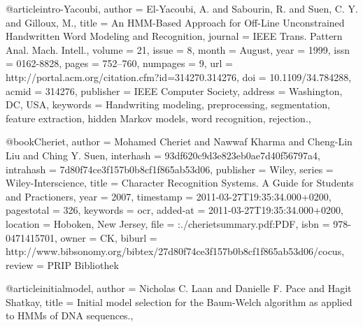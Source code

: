 @article{intro-Yacoubi,
 author = {El-Yacoubi, A. and Sabourin, R. and Suen, C. Y. and Gilloux, M.},
 title = {An HMM-Based Approach for Off-Line  Unconstrained Handwritten Word Modeling and Recognition},
 journal = {IEEE Trans. Pattern Anal. Mach. Intell.},
 volume = {21},
 issue = {8},
 month = {August},
 year = {1999},
 issn = {0162-8828},
 pages = {752--760},
 numpages = {9},
 url = {http://portal.acm.org/citation.cfm?id=314270.314276},
 doi = {10.1109/34.784288},
 acmid = {314276},
 publisher = {IEEE Computer Society},
 address = {Washington, DC, USA},
 keywords = {Handwriting modeling, preprocessing, segmentation, feature extraction, hidden Markov models, word recognition, rejection.},
} 

@book{Cheriet,
  author = {Mohamed Cheriet and Nawwaf Kharma and Cheng-Lin Liu and Ching Y. Suen},
  interhash = {93df620c9d3e823eb0ae7d40f56797a4},
  intrahash = {7d80f74ce3f157b0b8cf1f865ab53d06},
  publisher = {Wiley},
  series = {Wiley-Interscience},
  title = {Character Recognition Systems. A Guide for Students and Practioners},
  year = 2007,
  timestamp = {2011-03-27T19:35:34.000+0200},
  pagestotal = {326},
  keywords = {ocr},
  added-at = {2011-03-27T19:35:34.000+0200},
  location = {Hoboken, New Jersey},
  file = {:./cherietsummary.pdf:PDF},
  isbn = {978-0471415701},
  owner = {CK},
  biburl = {http://www.bibsonomy.org/bibtex/27d80f74ce3f157b0b8cf1f865ab53d06/cocus},
  review = {PRIP Bibliothek}
}

@article{initialmodel,
  author    = {Nicholas C. Laan and Danielle F. Pace and Hagit Shatkay},
  title     = {Initial model selection for the Baum-Welch algorithm as applied to HMMs of DNA sequences.},
}

